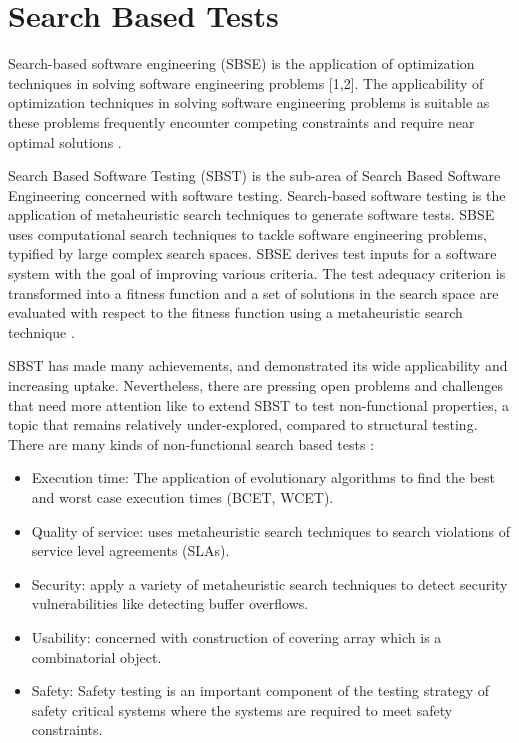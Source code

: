 \documentclass[times]{stvrauth}
\begin{document}
\section{Search Based Tests}

Search-based software engineering (SBSE) is the application of optimization techniques in solving software engineering problems [1,2]. The applicability of optimization techniques in solving software engineering problems is suitable as these problems frequently encounter competing constraints and require near optimal solutions \cite{Afzal2009a} \cite{Harman2015}. 


Search Based Software Testing (SBST) is the sub-area of Search Based Software Engineering concerned with software testing. Search-based software testing is the application of metaheuristic search techniques to generate software tests. SBSE uses computational search techniques to tackle software engineering problems, typified by large complex search spaces. SBSE derives test inputs for a software system with the goal of improving various criteria. The test adequacy criterion is transformed into a fitness function and a set of solutions in the search space are evaluated with respect to the fitness function using a metaheuristic search technique \cite{Afzal2009a} \cite{Aleti2016} \cite{Harman2015}.

SBST has made many achievements, and demonstrated its wide applicability and increasing uptake. Nevertheless, there are pressing open problems and challenges that need more attention like to extend SBST to test non-functional properties, a topic that remains relatively under-explored, compared to structural testing. There are many kinds of non-functional search based tests  \cite{Afzal2009a}:

\begin{itemize}
\item Execution time: The application of evolutionary algorithms to find the best and worst case execution times (BCET, WCET).
\item Quality of service: uses metaheuristic search techniques to search violations of service level agreements (SLAs).
\item Security: apply a variety of metaheuristic search techniques  to detect security vulnerabilities like detecting buffer overflows.
\item Usability: concerned with construction of covering array which is a combinatorial object.
\item Safety: Safety testing is an important component of the testing strategy of safety critical systems where the systems are required to meet safety constraints.
\end{itemize}
\end{document}

